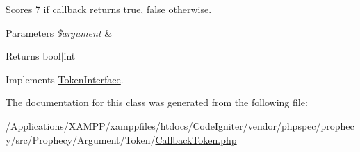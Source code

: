 Scores 7 if callback returns true, false otherwise.


\begin{DoxyParams}{Parameters}
{\em \$argument} & \\
\hline
\end{DoxyParams}
\begin{DoxyReturn}{Returns}
bool$\vert$int 
\end{DoxyReturn}


Implements \mbox{\hyperlink{interface_prophecy_1_1_argument_1_1_token_1_1_token_interface_a8d5bf47ab6eaa935458d5ad160e52822}{Token\+Interface}}.



The documentation for this class was generated from the following file\+:\begin{DoxyCompactItemize}
\item 
/\+Applications/\+X\+A\+M\+P\+P/xamppfiles/htdocs/\+Code\+Igniter/vendor/phpspec/prophecy/src/\+Prophecy/\+Argument/\+Token/\mbox{\hyperlink{_callback_token_8php}{Callback\+Token.\+php}}\end{DoxyCompactItemize}
